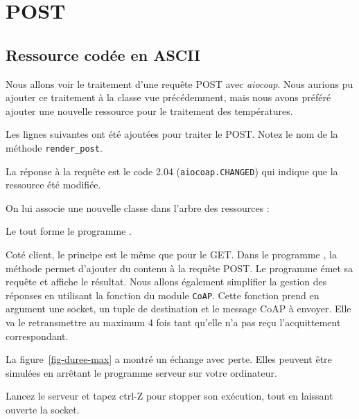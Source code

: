  
 \section{POST}
 
 \subsection {Ressource codée en ASCII}
 
 Nous allons voir le traitement d’une requête POST avec \textit{aiocoap}. Nous aurions pu ajouter ce traitement à la classe  vue précédemment, mais nous avons préféré ajouter une nouvelle ressource pour le traitement des températures. 

Les lignes suivantes ont été ajoutées pour traiter le POST. Notez le nom de la méthode \texttt{render\_post}.



La réponse à la requête est le code 2.04 (\texttt{aiocoap.CHANGED}) qui indique que la ressource été modifiée. 

On lui associe une nouvelle classe dans l’arbre des ressources :



Le tout forme le programme .

         \vspace{1em}

Coté client, le principe est le même que pour le GET. Dans le programme , la méthode  permet d’ajouter du contenu à la requête POST. Le programme émet sa requête et affiche le résultat. Nous allons également simplifier la gestion des réponses en utilisant la fonction  du module \texttt{CoAP}. Cette fonction prend en argument une socket, un tuple de destination et le message CoAP à envoyer. Elle va le retransmettre au maximum 4 fois tant qu’elle n’a pas reçu l’acquittement correspondant.


La figure~\vref{fig-duree-max} a montré un échange avec perte. Elles peuvent être simulées en arrêtant le programme serveur sur votre ordinateur.

Lancez le serveur  et tapez ctrl-Z pour stopper son exécution, tout en laissant ouverte la socket.

